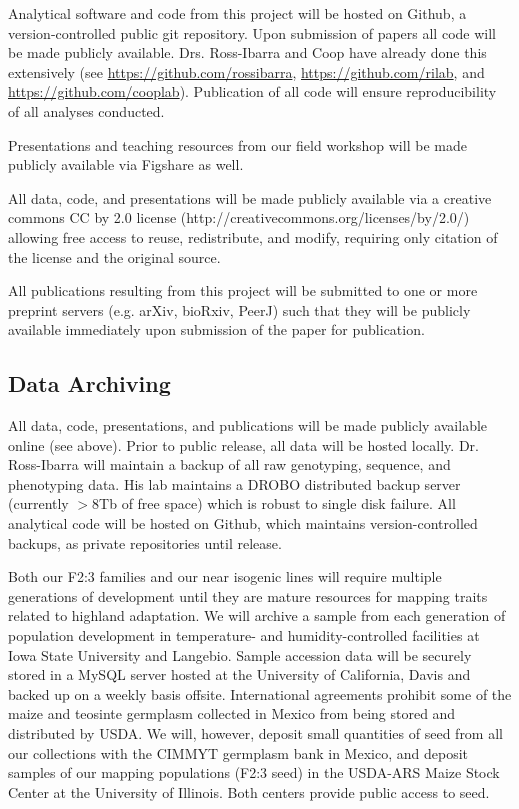 Analytical software and code from this project will be hosted on Github, a version-controlled public git repository.  Upon submission of papers all code will be made publicly available.  Drs. Ross-Ibarra and Coop have already done this extensively (see \url{https://github.com/rossibarra}, \url{https://github.com/rilab}, and \url{https://github.com/cooplab}). Publication of all code will ensure reproducibility of all analyses conducted.  

Presentations and teaching resources from our field workshop will be made publicly available via Figshare as well.

All data, code, and presentations will be made publicly available via a creative commons CC by 2.0 license (http://creativecommons.org/licenses/by/2.0/) allowing free access to reuse, redistribute, and modify, requiring only citation of the license and the original source.

All publications resulting from this project will be submitted to one or more preprint servers (e.g. arXiv, bioRxiv, PeerJ) such that they will be publicly available immediately upon submission of the paper for publication.

\subsection*{Data Archiving}

All data, code, presentations, and publications will be made publicly available online (see above).  Prior to public release, all data will be hosted locally.  Dr. Ross-Ibarra will maintain a backup of all raw genotyping, sequence, and phenotyping data.  His lab maintains a DROBO distributed backup server (currently $>8$Tb of free space) which is robust to single disk failure. All analytical code will be hosted on Github, which maintains version-controlled backups, as private repositories until release. 

Both our F2:3 families and our near isogenic lines will require multiple generations of development until they are mature resources for mapping traits related to highland adaptation. We will archive a sample from each generation of population development in temperature- and humidity-controlled facilities at Iowa State University and Langebio. Sample accession data will be securely stored in a MySQL server hosted at the University of California, Davis and backed up on a weekly basis offsite.  International agreements prohibit some of the maize and teosinte germplasm collected in Mexico from being stored and distributed by USDA.  We will, however, deposit small quantities of seed from all our collections with the CIMMYT germplasm bank in Mexico, and deposit samples of our mapping populations (F2:3 seed) in the USDA-ARS Maize Stock Center at the University of Illinois.  Both centers provide public access to seed.


